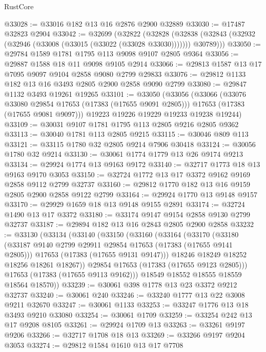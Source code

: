 \begin{lexlean}{RustCore}
\begin{coremodule}
@33028 := @33016 @182 @13 @16 @2876 @2900 @32889
@33030 := @17487 @32823 @2904
@33042 := @32699
    (@32822
      (@32828
        (@32838 (@32843 (@32932 (@32946 (@33008 (@33015 (@33022 (@33028 @33030))))))) @30789)))
@33050 := @29784 @1589 @1781 @1795 @113 @9098 @9107 @2805 @9364
@33056 := @29887 @1588 @18 @11 @9098 @9105 @2914
@33066 := @29813 @1587 @13 @17 @7095 @9097 @9104 @2858 @9080 @2799 @29833
@33076 := @29812 @1133 @182 @13 @16 @3493 @2805 @2900 @2858 @9090 @2799
@33080 := @29847 @1132 @3493 @19261 @19265
@33101 := @33050
    (@33056
      (@33066
        (@33076 @33080 @29854 @17653 (@17383 (@17655 @9091 @2805)))
        @17653
        (@17383 (@17655 @9081 @9097)))
      @19223
      @19226
      @19229
      @19233
      @19238
      @19244)
@33109 := @30031 @9107 @1781 @1795 @113 @2805 @9216 @2805 @9362
@33113 := @30040 @1781 @113 @2805 @9215
@33115 := @30046 @809 @113
@33121 := @33115 @1780 @32 @2805 @9214 @7906 @30418
@33124 := @30056 @1780 @32 @9214
@33130 := @30061 @1774 @1779 @13 @26 @9174 @9213
@33134 := @29924 @1774 @13 @9163 @9172
@33140 := @32717 @1773 @18 @13 @9163 @9170 @3053
@33150 := @32724 @1772 @13 @17 @3372 @9162 @9169 @2858 @9112 @2799 @32737
@33160 := @29812 @1770 @182 @13 @16 @9159 @2805 @2900 @2858 @9122 @2799
@33164 := @29924 @1770 @13 @9148 @9157
@33170 := @29929 @1659 @18 @13 @9148 @9155 @2891
@33174 := @32724 @1490 @13 @17 @3372
@33180 := @33174 @9147 @9154 @2858 @9130 @2799 @32737
@33187 := @29894 @182 @13 @16 @2843 @2805 @2900 @2858
@33232 := @33130
    (@33134
      (@33140
        (@33150
          (@33160
            (@33164
              (@33170
                (@33180
                  (@33187 @9140 @2799 @29911 @29854 @17653 (@17383 (@17655 @9141 @2805)))
                  @17653
                  (@17383 (@17655 @9131 @9147)))
                @18246
                @18249
                @18252
                @18256
                @18261
                @18267))
            @29854
            @17653
            (@17383 (@17655 @9123 @2805)))
          @17653
          (@17383 (@17655 @9113 @9162)))
        @18549
        @18552
        @18555
        @18559
        @18564
        @18570))
@33239 := @30061 @398 @1778 @13 @23 @3372 @9212 @32737
@33240 := @30061 @240
@33246 := @33240 @1777 @13 @22 @3008 @9211 @32670
@33247 := @30061 @1133
@33253 := @33247 @1776 @13 @18 @3493 @9210 @33080
@33254 := @30061 @1709
@33259 := @33254 @242 @13 @17 @9208 @8105
@33261 := @29924 @1709 @13
@33263 := @33261 @9197 @9206
@33266 := @32717 @1708 @18 @13
@33269 := @33266 @9197 @9204 @3053
@33274 := @29812 @1584 @1610 @13 @17 @7708

\end{coremodule}
\end{lexlean}
